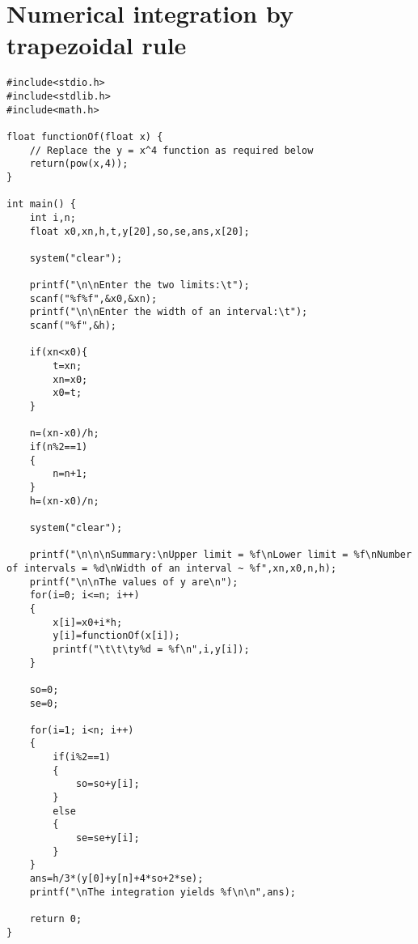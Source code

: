 \documentclass[11pt,oneside]{article}
\begin{document}
\section{Numerical integration by trapezoidal rule}
\begin{lstlisting}
#include<stdio.h>
#include<stdlib.h>
#include<math.h>

float functionOf(float x) {
    // Replace the y = x^4 function as required below
    return(pow(x,4));
}

int main() {
    int i,n;
    float x0,xn,h,t,y[20],so,se,ans,x[20];
    
    system("clear");
    
    printf("\n\nEnter the two limits:\t");
    scanf("%f%f",&x0,&xn);
    printf("\n\nEnter the width of an interval:\t");
    scanf("%f",&h);
    
    if(xn<x0){
        t=xn;
        xn=x0;
        x0=t;
    }
    
    n=(xn-x0)/h;
    if(n%2==1)
    {
        n=n+1;
    }
    h=(xn-x0)/n;
    
    system("clear");
        
    printf("\n\n\nSummary:\nUpper limit = %f\nLower limit = %f\nNumber of intervals = %d\nWidth of an interval ~ %f",xn,x0,n,h);
    printf("\n\nThe values of y are\n");
    for(i=0; i<=n; i++)
    {
        x[i]=x0+i*h;
        y[i]=functionOf(x[i]);
        printf("\t\t\ty%d = %f\n",i,y[i]);
    }

    so=0;
    se=0;

    for(i=1; i<n; i++)
    {
        if(i%2==1)
        {
            so=so+y[i];
        }
        else
        {
            se=se+y[i];
        }
    }
    ans=h/3*(y[0]+y[n]+4*so+2*se);
    printf("\nThe integration yields %f\n\n",ans);
    
    return 0;
}
\end{lstlisting}
\pagebreak
%
%
\end{document}
